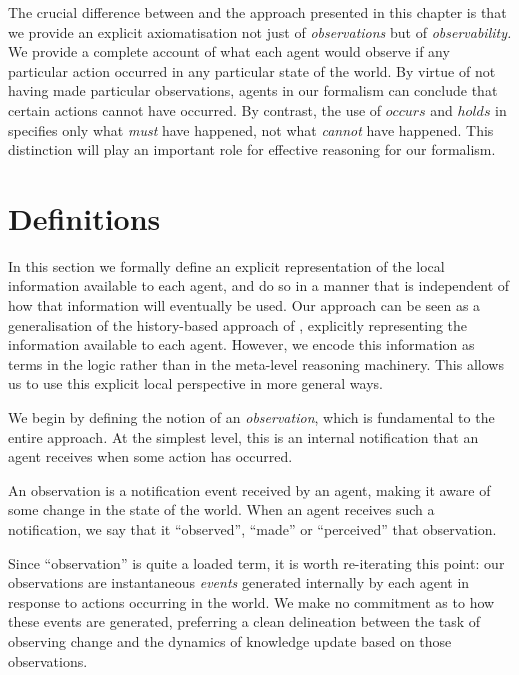 The crucial difference between \citep{pinto98sc_observations} and
the approach presented in this chapter is that we provide an explicit
axiomatisation not just of \emph{observations} but of \emph{observability.}
We provide a complete account of what each agent would observe if
any particular action occurred in any particular state of the world.
By virtue of not having made particular observations, agents in our
formalism can conclude that certain actions cannot have occurred.
By contrast, the use of $occurs$ and $holds$ in \citep{pinto98sc_observations}
specifies only what \emph{must} have happened, not what \emph{cannot}
have happened. This distinction will play an important role for effective
reasoning for our formalism.


\section{Definitions\label{sec:Observations:Definitions}}

In this section we formally define an explicit representation of the
local information available to each agent, and do so in a manner that
is independent of how that information will eventually be used. Our
approach can be seen as a generalisation of the history-based approach
of \citep{giacomo99indigolog}, explicitly representing the information
available to each agent. However, we encode this information as terms
in the logic rather than in the meta-level reasoning machinery. This
allows us to use this explicit local perspective in more general ways.

We begin by defining the notion of an \emph{observation}, which is
fundamental to the entire approach\emph{.} At the simplest level,
this is an internal notification that an agent receives when some
action has occurred.

\begin{defnL}
[{Observations}] An observation is a notification event received
by an agent, making it aware of some change in the state of the world.
When an agent receives such a notification, we say that it {}``observed'',
{}``made'' or {}``perceived'' that observation. 
\end{defnL}
Since {}``observation'' is quite a loaded term, it is worth re-iterating
this point: our observations are instantaneous \emph{events} generated
internally by each agent in response to actions occurring in the world.
We make no commitment as to how these events are generated, preferring
a clean delineation between the task of observing change and the dynamics
of knowledge update based on those observations.

